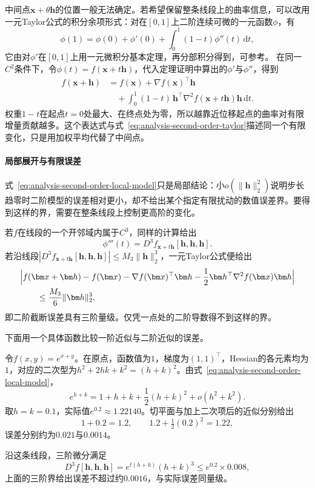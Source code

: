 中间点$\bm x+\theta\bm h$的位置一般无法确定。若希望保留整条线段上的曲率信息，可以改用一元Taylor公式的积分余项形式：对在$[0,1]$上二阶连续可微的一元函数$\phi$，有
\[
 \phi(1)=\phi(0)+\phi'(0)+\int_0^1(1-t)\phi''(t)\,\mathrm dt,
\]
它由对$\phi'$在$[0,1]$上用一元微积分基本定理，再分部积分得到，可参考。
在同一$C^2$条件下，令$\phi(t)=f(\bm x+t\bm h)$，代入定理证明中算出的$\phi'$与$\phi''$，得到
\begin{equation}
 \begin{aligned}
 f(\bm{x}+\bm{h})
 &=f(\bm{x})+\nabla f(\bm{x})^{\top}\bm{h}\\
 &\quad+\int_0^1(1-t)\,\bm{h}^{\top}\nabla^2f(\bm{x}+t\bm{h})\bm{h}\,\mathrm{d}t.
 \end{aligned}
\label{eq:multivariable-second-order-integral-taylor}
\end{equation}
权重$1-t$在起点$t=0$处最大、在终点处为零，所以越靠近位移起点的曲率对有限增量贡献越多。这个表达式与式~\eqref{eq:analysis-second-order-taylor}描述同一个有限变化，只是用加权平均代替了中间点。

\paragraph{局部展开与有限误差}
式~\eqref{eq:analysis-second-order-local-model}只是局部结论：小$o(\lVert\bm h\rVert_2^2)$说明步长趋零时二阶模型的误差相对更小，却不给出某个指定有限扰动的数值误差界。要得到这样的界，需要在整条线段上控制更高阶的变化。

若$f$在线段的一个开邻域内属于$C^3$，同样的计算给出
\[
 \phi'''(t)=D^3f_{\bm x+t\bm h}[\bm h,\bm h,\bm h].
\]
若沿线段$|D^3f_{\bm x+t\bm h}[\bm h,\bm h,\bm h]|\leq M_3\lVert\bm h\rVert_2^3$，一元Taylor公式便给出
\begin{equation}
 \begin{aligned}
 &\Bigl|f(\bm x+\bm h)-f(\bm x)-\nabla f(\bm x)^\top\bm h-\frac12\bm h^\top\nabla^2f(\bm x)\bm h\Bigr|\\
 &\qquad\leq\frac{M_3}6\lVert\bm h\rVert_2^3 ,
 \end{aligned}
\label{eq:multivariable-third-order-error-bound}
\end{equation}
即二阶截断误差具有三阶量级。仅凭一点处的二阶导数得不到这样的界。

下面用一个具体函数比较一阶近似与二阶近似的误差。
\begin{example}[指数函数的二阶Taylor近似]
\label{ex:multivariable-exponential-taylor}
令$f(x,y)=e^{x+y}$。在原点，函数值为$1$，梯度为$(1,1)^\top$，Hessian的各元素均为$1$，对应的二次型为$h^2+2hk+k^2=(h+k)^2$。由式~\eqref{eq:analysis-second-order-local-model}，
\[
 e^{h+k}=1+h+k+\frac12(h+k)^2+o(h^2+k^2).
\]
取$h=k=0.1$，实际值$e^{0.2}\approx1.22140$。切平面与加上二次项后的近似分别给出
\[
 1+0.2=1.2,\qquad 1.2+\tfrac12(0.2)^2=1.22,
\]
误差分别约为$0.021$与$0.0014$。

沿这条线段，三阶微分满足
\[
 D^3f[\bm h,\bm h,\bm h]=e^{t(h+k)}(h+k)^3\leq e^{0.2}\times0.008,
\]
上面的三阶界给出误差不超过约$0.0016$，与实际误差同量级。
\end{example}

